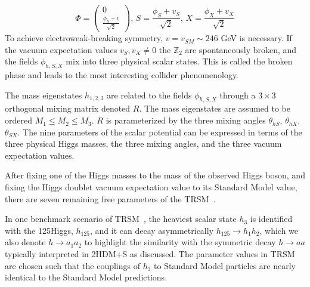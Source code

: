 \begin{equation}
    \Phi = \begin{pmatrix} 0 \\ \frac{\phi_h + v}{\sqrt{2}} \end{pmatrix}, 
    \,
    S = \frac{\phi_S + v_S}{\sqrt{2}} ,
    \,
    X = \frac{\phi_X + v_X}{\sqrt{2}}
\end{equation}
To achieve electroweak-breaking symmetry, $v  = v_{SM} \sim 246$ GeV is necessary. If the vacuum expectation values $v_S, v_X \neq 0$ the $\mathbb{Z}_2$ are spontaneously broken, and the fields $\phi_{h,S,X}$ mix into three physical scalar states. This is called the broken phase and leads to the most interesting collider phenomenology.

The mass eigenstates $h_{1,2,3}$ are related to the fields $\phi_{h,S,X}$ through a $3\times 3$ orthogonal mixing matrix denoted $R$. The mass eigenstates are assumed to be ordered $M_1 \leq M_2 \leq M_3$. $R$ is parameterized by the three mixing angles $\theta_{hS}$, $\theta_{hX}$, $\theta_{SX}$. The nine parameters of the scalar potential can be expressed in terms of the three physical Higgs masses, the three mixing angles, and the three vacuum expectation values. 

After fixing one of the Higgs masses to the mass of the observed Higgs boson, and fixing the Higgs doublet vacuum expectation value to its Standard Model value, there are seven remaining free parameters of the TRSM~\cite{Robens:2019kga}.

In one benchmark scenario of TRSM~\cite{Robens:2019kga}, the heaviest scalar state $h_3$ is identified with the 125\GeV Higgs, $h_{125}$, and it can decay asymmetrically $h_{125} \rightarrow h_1 h_2$, which we also denote $h \rightarrow a_1 a_2$ to highlight the similarity with the symmetric decay $h \rightarrow aa$ typically interpreted in 2HDM+S as discussed. The parameter values in TRSM are chosen such that the couplings of $h_3$ to Standard Model particles are nearly identical to the Standard Model predictions. 

